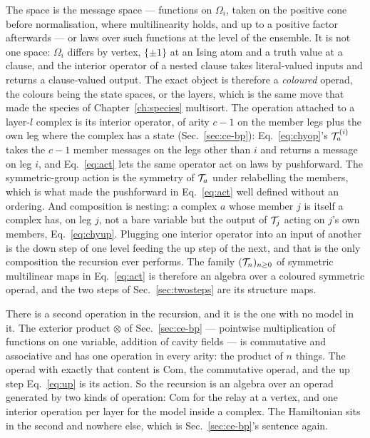 The space is the message space --- functions on $\Omega_{i}$, taken on the
positive cone before normalisation, where multilinearity holds, and up to a
positive factor afterwards --- or laws over such functions at the level of
the ensemble. It is not one space: $\Omega_{i}$ differs by vertex,
$\{\pm1\}$ at an Ising atom and a truth value at a clause, and the
interior operator of a nested clause takes literal-valued inputs and
returns a clause-valued output. The exact object is therefore a
\emph{coloured} operad, the colours being the state spaces, or the layers,
which is the same move that made the species of Chapter~\ref{ch:species}
multisort. The operation attached to a layer-$l$ complex is its interior
operator, of arity $c-1$ on the member legs plus the own leg where the
complex has a state (Sec.~\ref{sec:ce-bp}): Eq.~\eqref{eq:chyop}'s $\mathcal{T}^{(i)}_{a}$ takes the $c-1$ member
messages on the legs other than $i$ and returns a message on leg $i$, and
Eq.~\eqref{eq:act} lets the same operator act on laws by pushforward. The
symmetric-group action is the symmetry of $\mathcal{T}_{a}$ under relabelling the
members, which is what made the pushforward in Eq.~\eqref{eq:act} well
defined without an ordering. And composition is nesting: a complex $a$ whose
member $j$ is itself a complex has, on leg $j$, not a bare variable but the
output of $\mathcal{T}_{j}$ acting on $j$'s own members, Eq.~\eqref{eq:chyup}.
Plugging one interior operator into an input of another is the down step of
one level feeding the up step of the next, and that is the only composition
the recursion ever performs. The family $(\mathcal{T}_{n})_{n\ge0}$ of symmetric
multilinear maps in Eq.~\eqref{eq:act} is therefore an algebra over a
coloured symmetric operad, and the two steps of Sec.~\ref{sec:twosteps} are its
structure maps.

There is a second operation in the recursion, and it is the one with no model
in it. The exterior product $\otimes$ of Sec.~\ref{sec:ce-bp} --- pointwise
multiplication of functions on one variable, addition of cavity fields ---
is commutative and associative and has one operation in every arity: the
product of $n$ things. The operad with exactly that content is $\mathrm{Com}$,
the commutative operad, and the up step Eq.~\eqref{eq:up} is its action.
So the recursion is an algebra over an operad generated by two kinds of
operation: $\mathrm{Com}$ for the relay at a vertex, and one interior
operation per layer for the model inside a complex. The Hamiltonian sits in
the second and nowhere else, which is Sec.~\ref{sec:ce-bp}'s sentence again.

